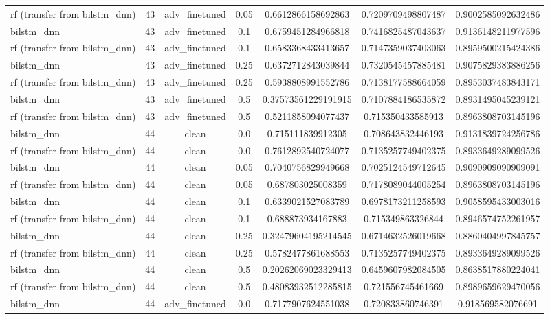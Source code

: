 \begin{table}[htbp]
\begin{tabular}{lcccccc}
rf (transfer from bilstm\_dnn) & 43 & adv\_finetuned & 0.05 & 0.6612866158692863 & 0.7209709498807487 & 0.9002585092632486 \\
bilstm\_dnn & 43 & adv\_finetuned & 0.1 & 0.6759451284966818 & 0.7416825487043637 & 0.9136148211977596 \\
rf (transfer from bilstm\_dnn) & 43 & adv\_finetuned & 0.1 & 0.6583368433413657 & 0.7147359037403063 & 0.8959500215424386 \\
bilstm\_dnn & 43 & adv\_finetuned & 0.25 & 0.6372712843039844 & 0.7320545457885481 & 0.9075829383886256 \\
rf (transfer from bilstm\_dnn) & 43 & adv\_finetuned & 0.25 & 0.5938808991552786 & 0.7138177588664059 & 0.8953037483843171 \\
bilstm\_dnn & 43 & adv\_finetuned & 0.5 & 0.37573561229191915 & 0.7107884186535872 & 0.8931495045239121 \\
rf (transfer from bilstm\_dnn) & 43 & adv\_finetuned & 0.5 & 0.5211858094077437 & 0.715350433585913 & 0.8963808703145196 \\
bilstm\_dnn & 44 & clean & 0.0 & 0.715111839912305 & 0.708643832446193 & 0.9131839724256786 \\
rf (transfer from bilstm\_dnn) & 44 & clean & 0.0 & 0.7612892540724077 & 0.7135257749402375 & 0.8933649289099526 \\
bilstm\_dnn & 44 & clean & 0.05 & 0.7040756829949668 & 0.7025124549712645 & 0.9090909090909091 \\
rf (transfer from bilstm\_dnn) & 44 & clean & 0.05 & 0.687803025008359 & 0.7178089044005254 & 0.8963808703145196 \\
bilstm\_dnn & 44 & clean & 0.1 & 0.6339021527083789 & 0.6978173211258593 & 0.9058595433003016 \\
rf (transfer from bilstm\_dnn) & 44 & clean & 0.1 & 0.688873934167883 & 0.715349863326844 & 0.8946574752261957 \\
bilstm\_dnn & 44 & clean & 0.25 & 0.32479604195214545 & 0.6714632526019668 & 0.8860404997845757 \\
rf (transfer from bilstm\_dnn) & 44 & clean & 0.25 & 0.5782477861688553 & 0.7135257749402375 & 0.8933649289099526 \\
bilstm\_dnn & 44 & clean & 0.5 & 0.20262069023329413 & 0.6459607982084505 & 0.8638517880224041 \\
rf (transfer from bilstm\_dnn) & 44 & clean & 0.5 & 0.48083932512285815 & 0.721556745461669 & 0.8989659629470056 \\
bilstm\_dnn & 44 & adv\_finetuned & 0.0 & 0.7177907624551038 & 0.720833860746391 & 0.918569582076691 \\

\end{tabular}
\end{table}
